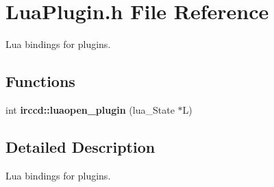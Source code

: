 \hypertarget{a00101}{\section{Lua\-Plugin.\-h File Reference}
\label{a00101}
}


Lua bindings for plugins.  


\subsection*{Functions}
\begin{DoxyCompactItemize}
\item 
int {\bfseries irccd\-::luaopen\-\_\-plugin} (lua\-\_\-\-State $\ast$L)
\end{DoxyCompactItemize}


\subsection{Detailed Description}
Lua bindings for plugins. 